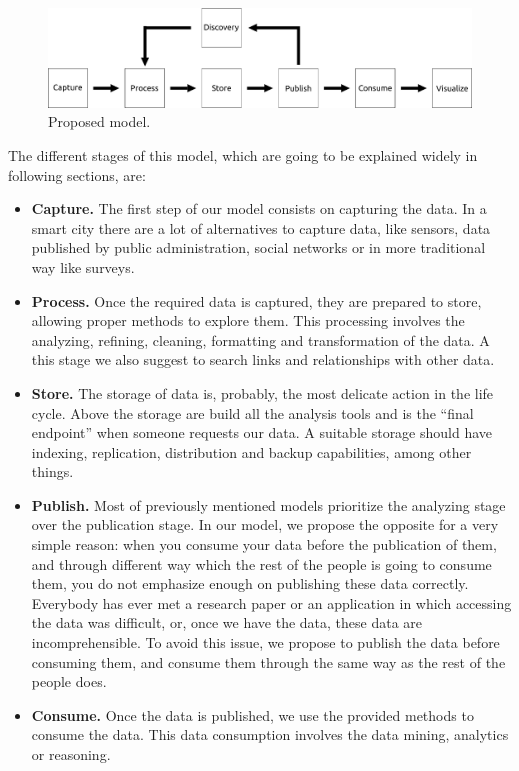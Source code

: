 \begin{figure}
    \center
    \includegraphics[width=0.88\linewidth]{img/data_lifecycle/model.pdf}
    \caption{Proposed model.}
    \label{fig:model}
\end{figure}

The different stages of this model, which are going to be explained widely in following sections, are:
\begin{itemize}
    \item \textbf{Capture.} The first step of our model consists on capturing the data. In a smart city there are a lot of alternatives to capture data, like sensors, data published by public administration, social networks or in more traditional way like surveys.
    \item \textbf{Process.} Once the required data is captured, they are prepared to store, allowing proper methods to explore them. This processing involves the analyzing, refining, cleaning, formatting and transformation of the data. A this stage we also suggest to search links and relationships with other data.
    \item \textbf{Store.} The storage of data is, probably, the most delicate action in the life cycle. Above the storage are build all the analysis tools and is the ``final endpoint'' when someone requests our data. A suitable storage should have indexing, replication, distribution and backup capabilities, among other things.
    \item \textbf{Publish.} Most of previously mentioned models prioritize the analyzing stage over the publication stage. In our model, we propose the opposite for a very simple reason: when you consume your data before the publication of them, and through different way which the rest of the people is going to consume them, you do not emphasize enough on publishing these data correctly. Everybody has ever met a research paper or an application in which accessing the data was difficult, or, once we have the data, these data are incomprehensible. To avoid this issue, we propose to publish the data before consuming them, and consume them through the same way as the rest of the people does.
    \item \textbf{Consume.} Once the data is published, we use the provided methods to consume the data. This data consumption involves the data mining, analytics or reasoning.

\end{itemize}
